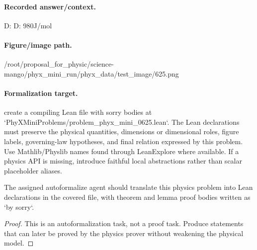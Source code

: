 \paragraph{Recorded answer/context.}
D: D: 980J/mol

\paragraph{Figure/image path.}
/root/proposal\_for\_physic/science-mango/phyx\_mini\_run/phyx\_data/test\_image/625.png

\paragraph{Formalization target.}
create a compiling Lean file with sorry bodies at `PhyXMiniProblems/problem\_phyx\_mini\_0625.lean`. The Lean declarations must preserve the physical quantities, dimensions or dimensional roles, figure labels, governing-law hypotheses, and final relation expressed by this problem.
Use Mathlib/Physlib names found through LeanExplore where available. If a physics API is missing, introduce faithful local abstractions rather than scalar placeholder aliases.

\begin{theorem}
\label{thm:physics:phyx_mini_0625:target}
The assigned autoformalize agent should translate this physics problem into Lean declarations in the covered file, with theorem and lemma proof bodies written as `by sorry`.
\end{theorem}
\begin{proof}
This is an autoformalization task, not a proof task. Produce statements that can later be proved by the physics prover without weakening the physical model.
\end{proof}

